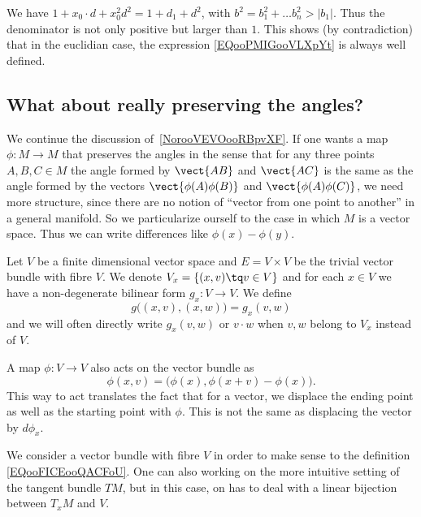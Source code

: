 We have \( 1+x_0\cdot d+x_0^2d^2=1+d_1+d^2\), with \( b^2=b_1^2+\ldots b_n^2>|b_1|\). Thus the denominator is not only positive but larger than \( 1\). This shows (by contradiction) that in the euclidian case, the expression \eqref{EQooPMIGooVLXpYt} is always well defined.

\subsection{What about really preserving the angles?}
\label{sebsecooCBKEooQOWqFo}

We continue the discussion of~\ref{NorooVEVOooRBpvXF}. If one wants a map \( \phi\colon M\to M\) that preserves the angles in the sense that for any three points \( A,B,C\in M\) the angle formed by \( \vect{ AB }\) and \( \vect{ AC }\) is the same as the angle formed by the vectors \( \vect{ \phi(A)\phi(B) }\) and \( \vect{ \phi(A)\phi(C) }\), we need more structure, since there are no notion of ``vector from one point to another'' in a general manifold. So we particularize ourself to the case in which \( M\) is a vector space. Thus we can write differences like \( \phi(x)-\phi(y)\).

Let \( V\) be a finite dimensional vector space and \( E=V\times V\) be the trivial vector bundle with fibre \( V\). We denote \( V_x=\{ (x,v)\tq v\in V \}\) and for each \( x\in V\) we have a non-degenerate bilinear form \( g_x\colon V\to V\). We define
\begin{equation}
	g\big( (x,v),(x,w) \big)=g_x(v,w)
\end{equation}
and we will often directly write \( g_x(v,w)\) or \( v\cdot w\) when \( v,w\) belong to \(V_x\) instead of \( V\).

A map \( \phi\colon V\to V\) also acts on the vector bundle as
\begin{equation}        \label{EQooFICEooQACFoU}
	\phi(x,v)=\big( \phi(x),\phi(x+v)-\phi(x) \big).
\end{equation}
This way to act translates the fact that for a vector, we displace the ending point as well as the starting point with \( \phi\). This is not the same as displacing the vector by \( d\phi_x\).

\begin{remark}
	We consider a vector bundle with fibre \( V\) in order to make sense to the definition \eqref{EQooFICEooQACFoU}. One can also working on the more intuitive setting of the tangent bundle \( TM\), but in this case, on has to deal with a linear bijection between \( T_xM\) and \( V\).
\end{remark}

